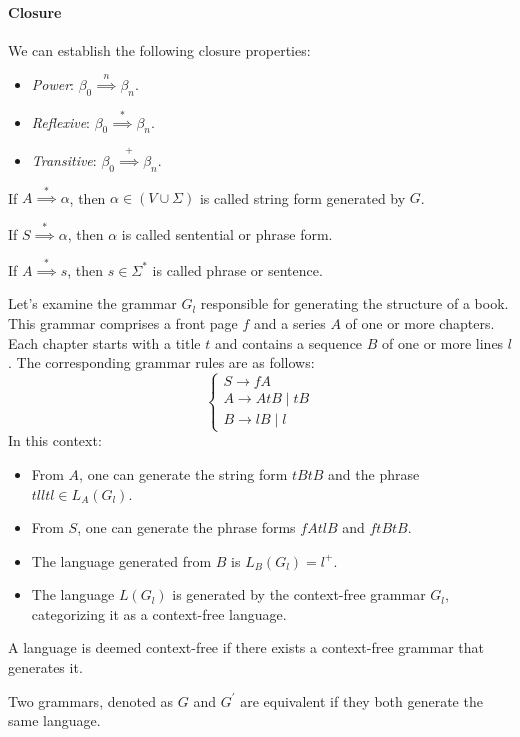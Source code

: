 \paragraph*{Closure}
We can establish the following closure properties:
\begin{itemize}
    \item \textit{Power}: $\beta_0 \overset{n}{\implies} \beta_n$. 
    \item \textit{Reflexive}: $\beta_0 \overset{\ast}{\implies} \beta_n$. 
    \item \textit{Transitive}: $\beta_0 \overset{+}{\implies} \beta_n$. 
\end{itemize}
\begin{definition}
    If $A \overset{\ast}{\implies} \alpha$, then $\alpha \in (V \cup \Sigma)$ is called string form generated by $G$. 
\end{definition}
\begin{definition}
    If $S \overset{\ast}{\implies} \alpha$, then $\alpha$ is called sentential or phrase form.
\end{definition}
\begin{definition}
    If $A \overset{\ast}{\implies} s$, then $s \in \Sigma^{\ast}$ is called phrase or sentence. 
\end{definition}
\begin{example}
    Let's examine the grammar $G_l$ responsible for generating the structure of a book.
    This grammar comprises a front page $f$ and a series $A$ of one or more chapters.
    Each chapter starts with a title $t$ and contains a sequence $B$ of one or more lines $l$.
    The corresponding grammar rules are as follows:
    \[\begin{cases}
        S \rightarrow fA \\
        A \rightarrow AtB \mid tB \\
        B \rightarrow lB \mid l
    \end{cases}\]
    In this context:
    \begin{itemize}
        \item From $A$, one can generate the string form $tBtB$ and the phrase $tlltl \in L_A(G_l)$.
        \item From $S$, one can generate the phrase forms $fAtlB$ and $ftBtB$. 
        \item The language generated from $B$ is $L_B(G_l)=l^{+}$.
        \item The language $L(G_l)$ is generated by the context-free grammar $G_l$, categorizing it as a context-free language.
    \end{itemize}
\end{example}
\begin{definition}
    A language is deemed context-free if there exists a context-free grammar that generates it.
\end{definition}
\begin{definition}
    Two grammars, denoted as $G$ and $G^{\prime}$ are equivalent if they both generate the same language.
\end{definition}